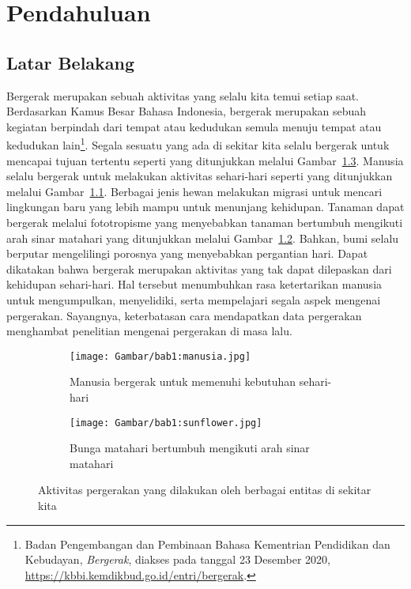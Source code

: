 \chapter{Pendahuluan}
\label{chap:intro}
   
\section{Latar Belakang}
\label{sec:label}

Bergerak merupakan sebuah aktivitas yang selalu kita temui setiap saat. Berdasarkan Kamus Besar Bahasa Indonesia, bergerak merupakan sebuah kegiatan berpindah dari tempat atau kedudukan semula menuju tempat atau kedudukan lain\footnote{Badan Pengembangan dan Pembinaan Bahasa Kementrian Pendidikan dan Kebudayan, \textit{Bergerak}, diakses pada tanggal 23 Desember 2020, \url{https://kbbi.kemdikbud.go.id/entri/bergerak}.}. Segala sesuatu yang ada di sekitar kita selalu bergerak untuk mencapai tujuan tertentu seperti yang ditunjukkan melalui Gambar~\ref{bab1:pergerakan}. Manusia selalu bergerak untuk melakukan aktivitas sehari-hari seperti yang ditunjukkan melalui Gambar~\ref{bab1:manusia}. Berbagai jenis hewan melakukan migrasi untuk mencari lingkungan baru yang lebih mampu untuk menunjang kehidupan. Tanaman dapat bergerak melalui fototropisme yang menyebabkan tanaman bertumbuh mengikuti arah sinar matahari yang ditunjukkan melalui Gambar~\ref{bab1:sunflower}. Bahkan, bumi selalu berputar mengelilingi porosnya yang menyebabkan pergantian hari. Dapat dikatakan bahwa bergerak merupakan aktivitas yang tak dapat dilepaskan dari kehidupan sehari-hari. Hal tersebut menumbuhkan rasa ketertarikan manusia untuk mengumpulkan, menyelidiki, serta mempelajari segala aspek mengenai pergerakan. Sayangnya, keterbatasan cara mendapatkan data pergerakan menghambat penelitian mengenai pergerakan di masa lalu.

\begin{figure}[h]
    \centering
    \begin{subfigure}[b]{0.425\textwidth}
        \texttt{[image: Gambar/bab1:manusia.jpg]}
        \caption{Manusia bergerak untuk memenuhi kebutuhan sehari-hari\protect\footnotemark[2]}
        \label{bab1:manusia}
    \end{subfigure} \hspace{0.35cm}
    \begin{subfigure}[b]{0.425\textwidth}
        \texttt{[image: Gambar/bab1:sunflower.jpg]}
        \caption{Bunga matahari bertumbuh mengikuti arah sinar matahari\protect\footnotemark[3]}
        \label{bab1:sunflower}
    \end{subfigure}
    \caption[Aktivitas pergerakan]{
    Aktivitas pergerakan yang dilakukan oleh berbagai entitas di sekitar kita}
    \label{bab1:pergerakan}
\end{figure}

